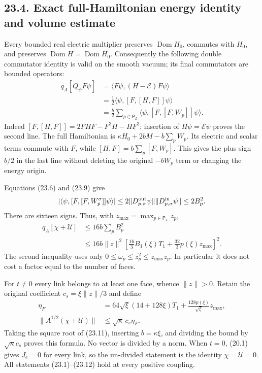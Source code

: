 \documentclass[
]{article}
\begin{document}
\subsection{23.4. Exact full-Hamiltonian energy identity and volume
estimate}\label{exact-full-hamiltonian-energy-identity-and-volume-estimate}

Every bounded real electric multiplier preserves
\(\operatorname{Dom}H_0\), commutes with \(H_0\), and preserves
\(\operatorname{Dom}H=\operatorname{Dom}H_0\). Consequently the
following double commutator identity is valid on the smooth vacuum; its
final commutators are bounded operators: \[
\begin{aligned}
q_A[Q_\psi F\psi]
 &=\langle F\psi,(H-\mathcal E)F\psi\rangle\\
 &=\frac12\langle\psi,[F,[H,F]]\psi\rangle\\
 &=\frac b2\sum_{p\in\mathsf P_L}
                  \langle\psi,[F,[F,W_p]]\psi\rangle .
\end{aligned}\tag{23.10}
\] Indeed \([F,[H,F]]=2FHF-F^2H-HF^2\); insertion of
\(H\psi=\mathcal E\psi\) proves the second line. The full Hamiltonian is
\(\kappa H_0+2bM-b\sum_pW_p\). Its electric and scalar terms commute
with \(F\), while \([H,F]=b\sum_p[F,W_p]\). This gives the plus sign
\(b/2\) in the last line without deleting the original \(-bW_p\) term or
changing the energy origin.

Equations (23.6) and (23.9) give \[
|\langle\psi,[F,[F,W_p^\sigma]]\psi\rangle|
 \le2\|D^{\rm out}_{p,\sigma}\psi\|
       \|D^{\rm in}_{p,\sigma}\psi\|\le2B_p^2.
\] There are sixteen signs. Thus, with
\(z_{\max}=\max_{p\in\mathsf P_L}z_p\), \[
\begin{aligned}
q_A[\chi+\mathcal U]
 &\le16b\sum_p B_p^2\\
 &\le16b\|z\|^2
 \left[\frac{16}{3}B_1(\xi)T_1
                 +\frac{32}{3}p(\xi)z_{\max}\right]^2 .
\end{aligned}\tag{23.11}
\] The second inequality uses only
\(0\le\omega_p\le z_p^2\le z_{\max}z_p\). In particular it does not cost
a factor equal to the number of faces.

For \(t\ne0\) every link belongs to at least one face, whence
\(\|z\|>0\). Retain the original coefficient \(c_s=\xi\|z\|/3\) and
define \[
\begin{aligned}
\eta_F
 &=64\sqrt{\xi}(14+128\xi)T_1
       +\frac{128p(\xi)}{\sqrt{\xi}}z_{\max},\\
\|A^{1/2}(\chi+\mathcal U)\|
 &\le\sqrt{\kappa}\,c_s\eta_F .
\end{aligned}\tag{23.12}
\] Taking the square root of (23.11), inserting \(b=\kappa\xi\), and
dividing the bound by \(\sqrt\kappa c_s\) proves this formula. No vector
is divided by a norm. When \(t=0\), (20.1) gives \(J_e=0\) for every
link, so the un-divided statement is the identity \(\chi=\mathcal U=0\).
All statements (23.1)--(23.12) hold at every positive coupling.
\end{document}
